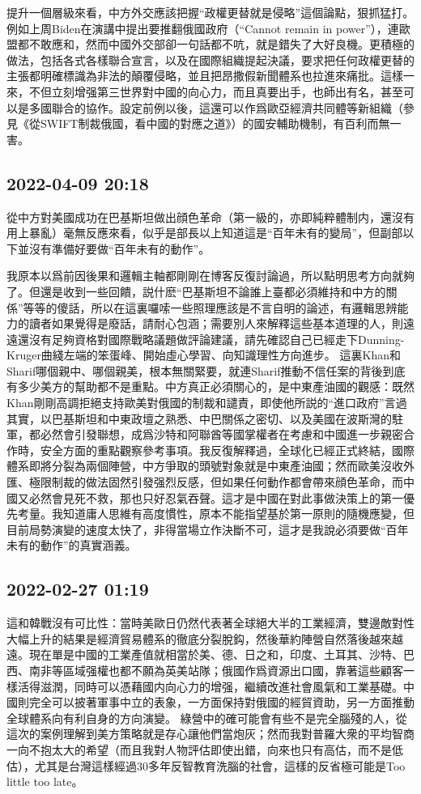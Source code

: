 \documentclass[twocolumn]{ctexart}
\begin{document}
提升一個層級來看，中方外交應該把握“政權更替就是侵略”這個論點，狠抓猛打。例如上周Biden在演講中提出要推翻俄國政府（“Cannot remain in power”），連歐盟都不敢應和，然而中國外交部卻一句話都不吭，就是錯失了大好良機。更積極的做法，包括各式各樣聯合宣言，以及在國際組織提起決議，要求把任何政權更替的主張都明確標識為非法的顛覆侵略，並且把昂撒假新聞體系也拉進來痛批。這樣一來，不但立刻增强第三世界對中國的向心力，而且真要出手，也師出有名，甚至可以是多國聯合的協作。設定前例以後，這還可以作爲歐亞經濟共同體等新組織（參見《從SWIFT制裁俄國，看中國的對應之道》）的國安輔助機制，有百利而無一害。
\subsection*{2022-04-09 20:18}

從中方對美國成功在巴基斯坦做出顔色革命（第一級的，亦即純粹體制内，還沒有用上暴亂）毫無反應來看，似乎是部長以上知道這是“百年未有的變局”，但副部以下並沒有準備好要做“百年未有的動作”。

我原本以爲前因後果和邏輯主軸都剛剛在博客反復討論過，所以點明思考方向就夠了。但還是收到一些回饋，説什麽“巴基斯坦不論誰上臺都必須維持和中方的關係”等等的傻話，所以在這裏囉嗦一些照理應該是不言自明的論述，有邏輯思辨能力的讀者如果覺得是廢話，請耐心包涵；需要別人來解釋這些基本道理的人，則遠遠還沒有足夠資格對國際戰略議題做評論建議，請先確認自己已經走下Dunning-Kruger曲綫左端的笨蛋峰、開始虛心學習、向知識理性方向進步。
這裏Khan和Sharif哪個親中、哪個親美，根本無關緊要，就連Sharif推動不信任案的背後到底有多少美方的幫助都不是重點。中方真正必須關心的，是中東產油國的觀感：既然Khan剛剛高調拒絕支持歐美對俄國的制裁和譴責，即使他所説的“進口政府”言過其實，以巴基斯坦和中東政壇之熟悉、中巴關係之密切、以及美國在波斯灣的駐軍，都必然會引發聯想，成爲沙特和阿聯酋等國掌權者在考慮和中國進一步親密合作時，安全方面的重點觀察參考事項。我反復解釋過，全球化已經正式終結，國際體系即將分裂為兩個陣營，中方爭取的頭號對象就是中東產油國；然而歐美沒收外匯、極限制裁的做法固然引發强烈反感，但如果任何動作都會帶來顔色革命，而中國又必然會見死不救，那也只好忍氣吞聲。這才是中國在對此事做決策上的第一優先考量。我知道庸人思維有高度慣性，原本不能指望基於第一原則的隨機應變，但目前局勢演變的速度太快了，非得當場立作決斷不可，這才是我說必須要做“百年未有的動作”的真實涵義。
\subsection*{2022-02-27 01:19}

這和韓戰沒有可比性：當時美歐日仍然代表著全球絕大半的工業經濟，雙邊敵對性大幅上升的結果是經濟貿易體系的徹底分裂脫鈎，然後華約陣營自然落後越來越遠。現在單是中國的工業產值就相當於美、德、日之和，印度、土耳其、沙特、巴西、南非等區域强權也都不願為英美站隊；俄國作爲資源出口國，靠著這些顧客一樣活得滋潤，同時可以憑藉國内向心力的增强，繼續改進社會風氣和工業基礎。中國則完全可以披著軍事中立的表象，一方面保持對俄國的經貿資助，另一方面推動全球體系向有利自身的方向演變。
綠營中的確可能會有些不是完全腦殘的人，從這次的案例理解到美方策略就是存心讓他們當炮灰；然而我對普羅大衆的平均智商一向不抱太大的希望（而且我對人物評估即使出錯，向來也只有高估，而不是低估），尤其是台灣這樣經過30多年反智教育洗腦的社會，這樣的反省極可能是Too little too late。
\end{document}
